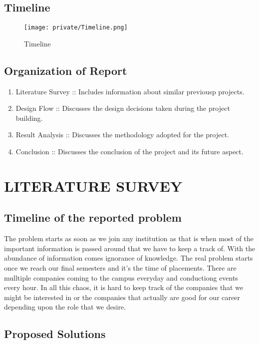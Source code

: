 \documentclass[14pt]{extarticle}
\begin{document}
\subsection{Timeline}

\begin{figure}[!htb]
    \begin{center}
        \texttt{[image: private/Timeline.png]}
    \end{center}
    \caption{Timeline}
\end{figure}

\subsection{Organization of Report}

\begin{enumerate}
    \item Literature Survey :: Includes information about similar previousp projects.
    \item Design Flow :: Discusses the design decisions taken during the project building.
    \item Result Analysis :: Discusses the methodology adopted for the project.
    \item Conclusion :: Discusses the conclusion of the project and its future aspect.
\end{enumerate}


\newpage
\section{LITERATURE SURVEY}

\subsection{Timeline of the reported problem}

The problem starts as soon as we join any institution as that is when most of the important information is passed around that we have to keep a track of. With the abundance of information comes ignorance of knowledge. The real problem starts once we reach our final semesters and it's the time of placements. There are mulltiple companies coming to the campus everyday and conductiong events every hour. In all this chaos, it is hard to keep track of the companies that we might be interested in or the companies that actually are good for our career depending upon the role that we desire. 

\subsection{Proposed Solutions}
\end{document}
